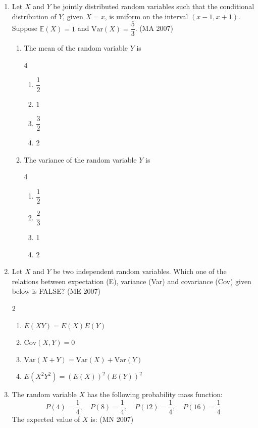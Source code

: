 \begin{enumerate}[label=\thesubsection.\arabic*,ref=\thesubsection.\theenumi]
\item Let $X$ and $Y$ be jointly distributed random variables such that the conditional distribution of $Y$, given $X = x$, is uniform on the interval $(x - 1, x + 1)$. Suppose $\mathbb{E}(X) = 1$ and $\text{Var}(X) = \dfrac{5}{3}$.
\hfill (MA 2007)
    \begin{enumerate}
\item The mean of the random variable $Y$ is
\begin{multicols}{4}
    \begin{enumerate}
        \item  $\dfrac{1}{2}$
        \item $1$
        \item $\dfrac{3}{2}$
        \item 2
    \end{enumerate}
    \end{multicols}
\item The variance of the random variable $Y$ is
\begin{multicols}{4}
    \begin{enumerate}
        \item $\dfrac{1}{2}$
        \item $\dfrac{2}{3}$
        \item 1
        \item 2
    \end{enumerate}
    \end{multicols}
\end{enumerate}

\item Let $ X $ and $ Y $ be two independent random variables. Which one of the relations between expectation (E), variance (Var) and covariance (Cov) given below is FALSE?
\hfill (ME 2007)
\begin{multicols}{2}
\begin{enumerate}
\item $ E(XY) = E(X)E(Y) $
\item $ \text{Cov}(X,Y) = 0 $
\item $ \text{Var}(X+Y) = \text{Var}(X) + \text{Var}(Y) $
\item $ E(X^2Y^2) = (E(X))^2(E(Y))^2 $
\end{enumerate}
\end{multicols}

\item The random variable $X$ has the following probability mass function:  
\[
P(4) = \frac14, \quad P(8) = \frac14, \quad P(12) = \frac14, \quad P(16) = \frac14
\]
The expected value of $X$ is:  
\hfill (MN 2007)
\begin{enumerate}
\end{enumerate}



\end{enumerate}
